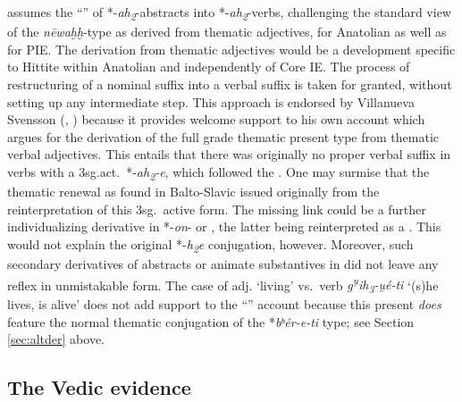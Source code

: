 \documentclass[output=paper,colorlinks,citecolor=brown]{langscibook}
\begin{document}
\citet[292--293]{Sasseville2015} assumes the “” of *-\textit{ah\textsubscript{2}}-abstracts into  *-\textit{ah\textsubscript{2}}-verbs, challenging the standard view of the \textit{nēwaḫḫ}-type as derived from thematic adjectives, for Anatolian as well as for PIE. The derivation from thematic adjectives would be a development specific to Hittite within Anatolian and independently of Core IE. The process of restructuring of a nominal suffix into a verbal suffix is taken for granted, without setting up any intermediate step. This approach is endorsed by Villanueva Svensson (\citeyear[391--392]{VillanuevaSvensson2020}, \citeyear[275--276]{VillanuevaSvensson2021}) because it provides welcome support to his own account which argues for the derivation of the full grade thematic present type from thematic verbal adjectives.  This entails that there was originally no proper verbal suffix in verbs with a 3sg.act.\ *-\textit{ah\textsubscript{2}-e}, which followed the . One may surmise that the thematic renewal as  found in Balto-Slavic issued originally from the reinterpretation of this 3sg.\ active form. The missing link could be a further individualizing derivative in *-\textit{on}- or , the latter being reinterpreted as a . This would not explain the original *-\textit{h\textsubscript{2}}\textit{e} conjugation, however. Moreover, such secondary derivatives of abstracts or animate substantives in  did not leave any reflex in unmistakable form. The case of adj.  ‘living’ vs.\ verb  \*\textit{g\textsuperscript{u̯}ih\textsubscript{3}-u̯é-ti} ‘(s)he lives, is alive’ does not add support to the “” account because this present \textit{does} feature the normal thematic conjugation of the *\textit{bʰér-e-ti} type; see Section \ref{sec:altder} above. 

\subsection{The Vedic evidence}
\end{document}
